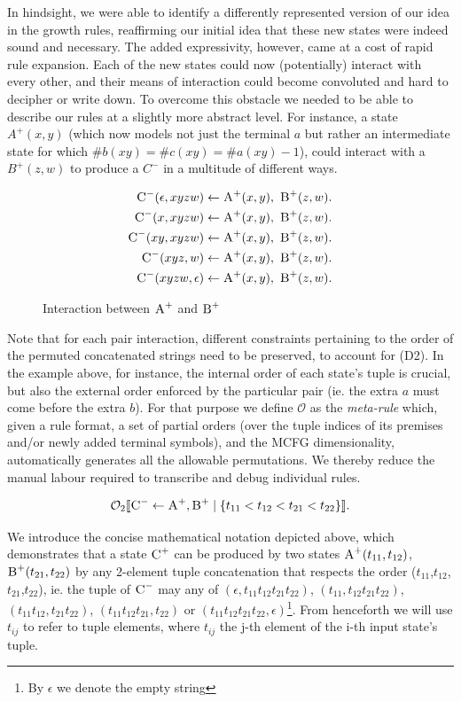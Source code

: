 \documentclass[nonatbib,numbers,10pt]{sigplanconf}
\newcommand\s{\textsc}
\newcommand{\Order}[5]{
	\[
	\mathcal{#1}_{#5}\llbracket #2 \leftarrow #3 \mid \{ #4 \} \rrbracket.
	\]
}
\newcommand{\Ord}[4]{\Order{O}{#1}{#2}{#3}{#4}}
\begin{document}
In hindsight, we were able to identify a differently represented version of our idea in the growth rules, reaffirming our initial idea that these new states were indeed sound and necessary. The added expressivity, however, came at a cost of rapid rule expansion. Each of the new states could now (potentially) interact with every other, and their means of interaction could become convoluted and hard to decipher or write down. To overcome this obstacle we needed to be able to describe our rules at a slightly more abstract level. For instance, a state $A^{+}(x,y)$ (which now models not just the terminal $a$ but rather an intermediate state for which $ \# b(xy) = \# c(xy) = \# a(xy)-1$), could interact with a $B^{+}(z,w)$ to produce a $C^{-}$ in a multitude of different ways.
\begin{figure}[h!]
\begin{align*}
\setcounter{equation}{0}
\s{C}^-(\epsilon, xyzw) \leftarrow \s{A}^+(x,y),\ \s{B}^+(z,w)&. \\
\s{C}^-(x, xyzw) \leftarrow \s{A}^+(x,y),\ \s{B}^+(z,w)&. \\
\s{C}^-(xy, xyzw) \leftarrow \s{A}^+(x,y),\ \s{B}^+(z,w)&. \\
\s{C}^-(xyz, w) \leftarrow \s{A}^+(x,y),\ \s{B}^+(z,w)&. \\
\s{C}^-(xyzw, \epsilon) \leftarrow \s{A}^+(x,y),\ \s{B}^+(z,w)&.
\end{align*}
\caption{Interaction between $\s{A}^+$ and $\s{B}^+$}
\label{fig:interaction}
\end{figure}

Note that for each pair interaction, different constraints pertaining to the order of the permuted concatenated strings need to be preserved, to account for (D2). In the example above, for instance, the internal order of each state's tuple is crucial, but also the external order enforced by the particular pair (ie. the extra $a$ must come before the extra $b$). For that purpose we define $\mathcal{O}$ as the \textit{meta-rule} which, given a rule format, a set of partial orders (over the tuple indices of its premises and/or newly added terminal symbols), and the MCFG dimensionality, automatically generates all the allowable permutations. We thereby reduce the manual labour required to transcribe and debug individual rules.
\Ord{\s{C}^-}{\s{A}^+, \s{B}^+}{t_{11} < t_{12} < t_{21} < t_{22}}{2}
We introduce the concise mathematical notation depicted above, which demonstrates that a state $\textsc{C}^{+}$ can be produced by two states $\textsc{A}^{+}(t_{11},t_{12})$, $\textsc{B}^{+}(t_{21},t_{22})$ by any 2-element tuple concatenation that respects the order ($t_{11}$,$t_{12}$,$t_{21}$,$t_{22}$), ie. the tuple of $\textsc{C}^{-}$ may any of $(\epsilon, t_{11}t_{12}t_{21}t_{22})$, $(t_{11}, t_{12}t_{21}t_{22})$, $(t_{11}t_{12},t_{21}t_{22})$, $(t_{11}t_{12}t_{21},t_{22})$ or $(t_{11}t_{12}t_{21}t_{22}, \epsilon)$\footnote{By $\epsilon$ we denote the empty string}. From henceforth we will use $t_{ij}$ to refer to tuple elements, where $t_{ij}$ the j-th element of the i-th input state's tuple. 
\end{document}
